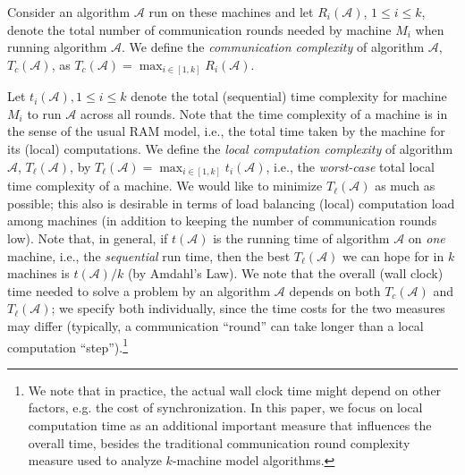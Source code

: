 Consider an algorithm \(\mathcal{A}\) run on these machines and let \(R_i(\mathcal{A})\), \(1 \leq i \leq k\), denote the total number of communication rounds needed by machine \(M_i\) when running algorithm \(\mathcal{A}\). We define the \emph{communication complexity} of algorithm \(\mathcal{A}\), \(T_c(\mathcal{A})\), as \(T_c(\mathcal{A}) = \max_{i \in [1,k]} R_i(\mathcal{A}).\)

Let \(t_i(\mathcal{A}), 1 \leq i \leq k\) denote the total (sequential) time complexity  for machine \(M_i\) to run \(\mathcal{A}\) across all rounds. Note that the time complexity of a machine
is in the sense of the usual RAM model, i.e., the total time taken by the machine for its (local) computations. We define the \textit{local computation complexity} of algorithm \(\mathcal{A}\), \(T_{\ell}(\mathcal{A})\), by \(T_{\ell}(\mathcal{A}) = \max_{i \in [1,k]} t_i(\mathcal{A})\), i.e., the \emph{worst-case} total local time complexity of a machine.
We would like to minimize $T_{\ell}(\mathcal{A})$ as much as possible; this also is desirable in terms of load balancing (local) computation load among machines (in addition to keeping
the number of communication rounds low). Note that, in general,
if $t(\mathcal{A})$ is  the  running time of algorithm \(\mathcal{A}\)
on \emph{one} machine, i.e., the \emph{sequential} run time, then the best $T_{\ell}(\mathcal{A})$ we can hope for in $k$ machines is $t(\mathcal{A})/k$ (by Amdahl's Law). We note that the overall (wall clock) time needed to solve a problem by an algorithm \(\mathcal{A}\) depends on both \(T_c(\mathcal{A})\)
and \(T_{\ell}(\mathcal{A})\); we specify both individually, since the  time costs for the two measures may differ (typically, a communication ``round'' can take longer than a local computation ``step'').\footnote{We note that in practice, the actual wall clock time might depend on other factors, e.g. the cost of synchronization. In this paper, we focus on  local computation time as an additional important  measure that influences the overall time, besides the traditional communication round complexity measure used to analyze $k$-machine model algorithms.}

